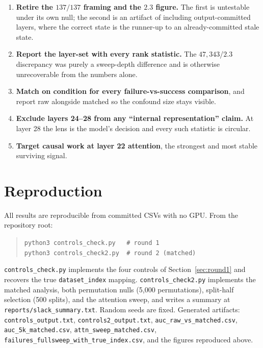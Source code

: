 \documentclass[11pt]{article}
\newcommand{\code}[1]{\texttt{\small #1}}
\begin{document}
\begin{enumerate}[leftmargin=*,itemsep=2pt]
\item \textbf{Retire the $137/137$ framing and the $2.3$ figure.} The first is untestable
      under its own null; the second is an artifact of including output-committed layers,
      where the correct state is the runner-up to an already-committed stale state.
\item \textbf{Report the layer-set with every rank statistic.} The $47{,}343$/$2.3$
      discrepancy was purely a sweep-depth difference and is otherwise unrecoverable from
      the numbers alone.
\item \textbf{Match on condition for every failure-vs-success comparison}, and report raw
      alongside matched so the confound size stays visible.
\item \textbf{Exclude layers 24--28 from any ``internal representation'' claim.} At layer 28
      the lens is the model's decision and every such statistic is circular.
\item \textbf{Target causal work at layer 22 attention}, the strongest and most stable
      surviving signal.
\end{enumerate}

\appendix
\section{Reproduction}

All results are reproducible from committed CSVs with no GPU. From the repository root:

\begin{quote}\code{python3 controls\_check.py \ \ \# round 1}\\
\code{python3 controls\_check2.py \ \# round 2 (matched)}\end{quote}

\code{controls\_check.py} implements the four controls of Section~\ref{sec:round1} and
recovers the true \code{dataset\_index} mapping. \code{controls\_check2.py} implements the
matched analysis, both permutation nulls (5{,}000 permutations), split-half selection
(500 splits), and the attention sweep, and writes a summary at
\code{reports/slack\_summary.txt}. Random seeds are fixed. Generated artifacts:
\code{controls\_output.txt}, \code{controls2\_output.txt}, \code{auc\_raw\_vs\_matched.csv},
\code{auc\_5k\_matched.csv}, \code{attn\_sweep\_matched.csv},
\code{failures\_fullsweep\_with\_true\_index.csv}, and the figures reproduced above.
\end{document}
